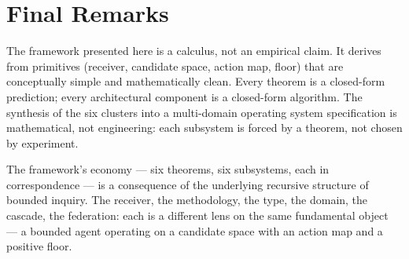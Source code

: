\documentclass[twocolumn,11pt,a4paper]{article}
\begin{document}
\section{Final Remarks}

The framework presented here is a calculus, not an empirical claim. It derives from primitives (receiver, candidate space, action map, floor) that are conceptually simple and mathematically clean. Every theorem is a closed-form prediction; every architectural component is a closed-form algorithm. The synthesis of the six clusters into a multi-domain operating system specification is mathematical, not engineering: each subsystem is forced by a theorem, not chosen by experiment.

The framework's economy — six theorems, six subsystems, each in correspondence — is a consequence of the underlying recursive structure of bounded inquiry. The receiver, the methodology, the type, the domain, the cascade, the federation: each is a different lens on the same fundamental object — a bounded agent operating on a candidate space with an action map and a positive floor.



\end{document}

